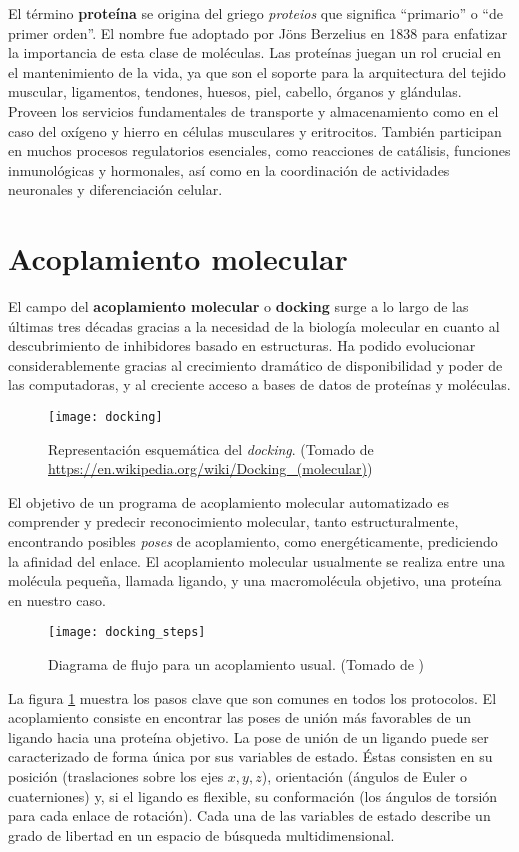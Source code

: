 El término \textbf{proteína} se origina del griego \textit{proteios}
que significa ``primario'' o ``de primer orden''. El nombre fue
adoptado por Jöns Berzelius en 1838 para enfatizar la importancia de
esta clase de moléculas. Las proteínas juegan un rol crucial en el
mantenimiento de la vida, ya que son el soporte para la arquitectura
del tejido muscular, ligamentos, tendones, huesos, piel, cabello,
órganos y glándulas. Proveen los servicios fundamentales de transporte
y almacenamiento como en el caso del oxígeno y hierro en células
musculares y eritrocitos. También participan en muchos procesos
regulatorios esenciales, como reacciones de catálisis, funciones
inmunológicas y hormonales, así como en la coordinación de actividades
neuronales y diferenciación celular.\cite{tamar}

\section{Acoplamiento molecular}
El campo del \textbf{acoplamiento molecular} o
\textbf{docking} surge a lo largo de las últimas tres décadas gracias a la
necesidad de la biología molecular en cuanto al descubrimiento de
inhibidores basado en estructuras. Ha podido evolucionar
considerablemente gracias al crecimiento dramático de disponibilidad y
poder de las computadoras, y al creciente acceso a bases de datos de
proteínas y moléculas.\cite{kukol}

\begin{figure}[H]
  \texttt{[image: docking]} \centering
  \caption{Representación esquemática del \textit{docking}.  (Tomado de
    \url{https://en.wikipedia.org/wiki/Docking_(molecular)})}
\end{figure}

El objetivo de un programa de acoplamiento molecular automatizado es comprender
y predecir reconocimiento molecular, tanto estructuralmente, encontrando
posibles \textit{poses} de acoplamiento, como energéticamente, prediciendo la
afinidad del enlace. El acoplamiento molecular usualmente se realiza entre una
molécula pequeña, llamada ligando, y una macromolécula objetivo, una proteína en
nuestro caso.

\begin{figure}[H]
  \texttt{[image: docking\_steps]}
  \caption{Diagrama de flujo para un acoplamiento usual.  (Tomado de
    \cite{kukol})}
  \label{fig:docking_flowchart}
\end{figure}

La figura \ref{fig:docking_flowchart} muestra los pasos clave que son
comunes en todos los protocolos. El acoplamiento consiste en encontrar
las poses de unión más favorables de un ligando hacia una proteína
objetivo. La pose de unión de un ligando puede ser caracterizado de
forma única por sus variables de estado. Éstas consisten en su
posición (traslaciones sobre los ejes $x, y, z$), orientación (ángulos
de Euler o cuaterniones) y, si el ligando es flexible, su conformación
(los ángulos de torsión para cada enlace de rotación). Cada una de las
variables de estado describe un grado de libertad en un espacio de
búsqueda multidimensional.

